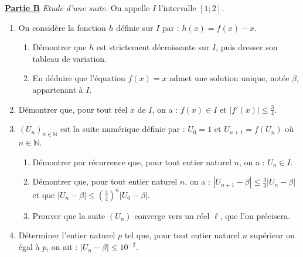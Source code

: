       \underline{\textbf{Partie B}} \textit{Etude d'une suite.} \newline
      On appelle $I$ l'intervalle $[1;2]$.
      \begin{enumerate}
            \item On consid\`ere la fonction $h$ d\'efinie sur $I$ par : $h(x) = f(x) - x$.
                  \begin{enumerate}
                        \item D\'emontrer que $h$ est strictement d\'ecroissante sur $I$,
                              puis dresser son tableau de variation.
                        \item En d\'eduire que l'\'equation $f(x) = x$ admet une solution unique, 
                              not\'ee $\beta$, appartenant \`a $I$.
                  \end{enumerate}
            \item D\'emontrer que, pour tout r\'eel $x$ de $I$, on a : $f(x) \in I$ et $|f'(x)| \leq \frac{3}{4}$.
            \item $(U_n)_{n\in\mathbb{N}}$ est la suite num\'erique d\'efinie par : $U_0 = 1$ et $U_{n+1} = f(U_n)$ o\`u 
                  $n\in\mathbb{N}$.
                  \begin{enumerate}
                        \item D\'emontrer par r\'ecurrence que, pour tout entier naturel $n$, on a : $U_n \in I$.
                        \item D\'emontrer que, pour tout entier naturel $n$, on a : 
                              $
                              |U_{n+1} - \beta| \leq \frac{3}{4} |U_n - \beta|
                              $
                              et que 
                              $
                              |U_n - \beta| \leq \left( \frac{3}{4} \right)^n |U_0 - \beta|
                              $.
                        \item Prouver que la suite $(U_n)$ converge vers un r\'eel $\ell$, que l'on pr\'ecisera.
                  \end{enumerate}
            \item D\'eterminer l'entier naturel $p$ tel que, pour tout entier naturel $n$ sup\'erieur ou \'egal \`a $p$, on ait :
                  $|U_n - \beta| \leq 10^{-2}$.
      \end{enumerate}



































